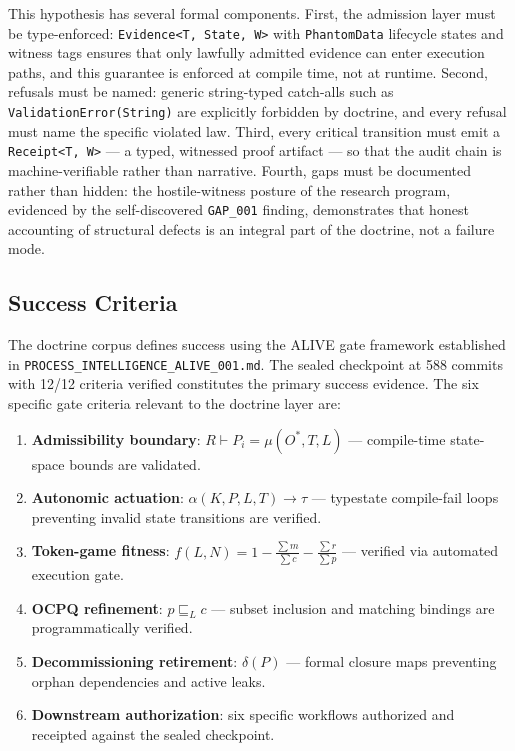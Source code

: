 This hypothesis has several formal components. First, the admission layer must be
type-enforced: \texttt{Evidence\textless{}T, State, W\textgreater{}} with
\texttt{PhantomData} lifecycle states and witness tags ensures that only lawfully admitted
evidence can enter execution paths, and this guarantee is enforced at compile time, not at
runtime. Second, refusals must be named: generic string-typed catch-alls such as
\texttt{ValidationError(String)} are explicitly forbidden by doctrine, and every refusal must
name the specific violated law. Third, every critical transition must emit a
\texttt{Receipt\textless{}T, W\textgreater{}} --- a typed, witnessed proof artifact --- so
that the audit chain is machine-verifiable rather than narrative. Fourth, gaps must be
documented rather than hidden: the hostile-witness posture of the research program, evidenced
by the self-discovered \texttt{GAP\_001} finding, demonstrates that honest accounting of
structural defects is an integral part of the doctrine, not a failure mode.

\subsection{Success Criteria}
\label{sec:doctrine-question-criteria}

The doctrine corpus defines success using the ALIVE gate framework established in
\texttt{PROCESS\_INTELLIGENCE\_ALIVE\_001.md}. The sealed checkpoint at 588 commits with
12/12 criteria verified constitutes the primary success evidence. The six specific gate
criteria relevant to the doctrine layer are:

\begin{enumerate}
  \item \textbf{Admissibility boundary}: $R \vdash P_i = \mu(O^*, T, L)$ --- compile-time
    state-space bounds are validated.
  \item \textbf{Autonomic actuation}: $\alpha(K, P, L, T) \to \tau$ --- typestate
    compile-fail loops preventing invalid state transitions are verified.
  \item \textbf{Token-game fitness}: $f(L, N) = 1 - \frac{\sum m}{\sum c} - \frac{\sum
    r}{\sum p}$ --- verified via automated execution gate.
  \item \textbf{OCPQ refinement}: $p \sqsubseteq_L c$ --- subset inclusion and matching
    bindings are programmatically verified.
  \item \textbf{Decommissioning retirement}: $\delta(P)$ --- formal closure maps preventing
    orphan dependencies and active leaks.
  \item \textbf{Downstream authorization}: six specific workflows authorized and receipted
    against the sealed checkpoint.
\end{enumerate}

